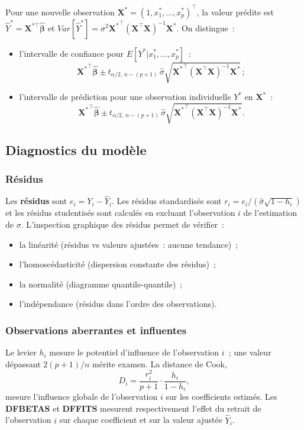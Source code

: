 \documentclass[11pt,letterpaper]{article}
\begin{document}
Pour une nouvelle observation $\boldsymbol{X}^* = (1, x_1^*,\ldots,x_p^*)^\top$, la valeur prédite est $\hat Y^* = \boldsymbol{X}^{*\top}\hat{\boldsymbol{\beta}}$ et $Var[\hat Y^*] = \sigma^2 {\boldsymbol{X}^*}^\top (\boldsymbol{X}^\top \boldsymbol{X})^{-1} \boldsymbol{X}^*$. On distingue~:
\begin{itemize}
\item l'intervalle de confiance pour $E[Y^*|x_1^*,\ldots,x_p^*]$~:
$${\boldsymbol{X}^*}^\top\hat{\boldsymbol{\beta}}\pm t_{\alpha/2,\,n-(p+1)}\,\hat\sigma\sqrt{{\boldsymbol{X}^*}^\top (\boldsymbol{X}^\top \boldsymbol{X})^{-1} \boldsymbol{X}^*}\,;$$
\item l'intervalle de prédiction pour une observation individuelle $Y^*$ en $\boldsymbol{X}^*$~:
$${\boldsymbol{X}^*}^\top\hat{\boldsymbol{\beta}} \pm t_{\alpha/2,\,n-(p+1)}\,\hat\sigma\sqrt{{\boldsymbol{X}^*}^\top (\boldsymbol{X}^\top \boldsymbol{X})^{-1} \boldsymbol{X}^*}.$$
\end{itemize}

\subsection{Diagnostics du modèle}

\subsubsection{Résidus}

Les \textbf{résidus} sont $e_i = Y_i - \hat Y_i$. Les résidus standardisés sont $r_i = e_i / (\hat\sigma\sqrt{1-h_i})$ et les résidus studentisés sont calculés en excluant l'observation $i$ de l'estimation de $\sigma$. L'inspection graphique des résidus permet de vérifier~:
\begin{itemize}
\item la linéarité (résidus vs valeurs ajustées~: aucune tendance)~;
\item l'homoscédasticité (dispersion constante des résidus)~;
\item la normalité (diagramme quantile-quantile)~;
\item l'indépendance (résidus dans l'ordre des observations).
\end{itemize}

\subsubsection{Observations aberrantes et influentes}

Le levier $h_i$ mesure le potentiel d'influence de l'observation $i$~; une valeur dépassant $2(p+1)/n$ mérite examen. La distance de Cook,
$$D_i = \frac{r_i^2}{p+1}\cdot\frac{h_i}{1-h_i},$$
mesure l'influence globale de l'observation $i$ sur les coefficients estimés. Les \textbf{DFBETAS} et \textbf{DFFITS} mesurent respectivement l'effet du retrait de l'observation $i$ sur chaque coefficient et sur la valeur ajustée $\hat Y_i$.
\end{document}
